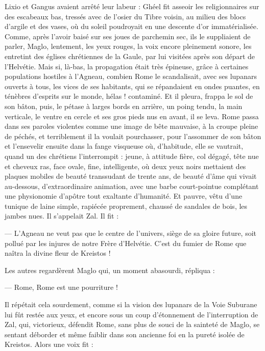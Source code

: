 \documentclass[a4paper, 11pt, oneside, polutonikogreek, french]{article}
\begin{document}
Lixio et Gangus avaient arrêté leur labeur : Ghéel fit asseoir les religionnaires sur des escabeaux bas, tressés avec de l'osier du Tibre voisin, au milieu des blocs d'argile et des vases, où du soleil poudroyait en une descente d'or immatérialisée. Comme, après l'avoir baisé sur ses joues de parchemin sec, ils le suppliaient de parler, Maglo, lentement, les yeux rouges, la voix encore pleinement sonore, les entretint des églises chrétiennes de la Gaule, par lui visitées après son départ de l'Helvétie. Mais si, là-bas, la propagation était très épineuse, grâce à certaines populations hostiles à l'Agneau, combien Rome le scandalisait, avec ses lupanars ouverts à tous, les vices de ses habitants, qui se répandaient en ondes puantes, en ténèbres d'esprits sur le monde, hélas ! contaminé. Et il pleura, frappa le sol de son bâton, puis, le pétase à larges bords en arrière, un poing tendu, la main verticale, le ventre en cercle et ses gros pieds nus en avant, il se leva. Rome passa dans ses paroles violentes comme une image de bête mauvaise, à la croupe pleine de péchés, et terriblement il la voulait pourchasser, pour l'assommer de son bâton et l'ensevelir ensuite dans la fange visqueuse où, d'habitude, elle se vautrait, quand un des chrétiens l'interrompit : jeune, à attitude fière, col dégagé, tête nue et cheveux ras, face ovale, fine, intelligente, où deux yeux noirs mettaient des plaques mobiles de beauté transsudant de trente ans, de beauté d'âme qui vivait au-dessous, d'extraordinaire animation, avec une barbe court-pointue complétant une physionomie d'apôtre tout exaltante d'humanité. Et pauvre, vêtu d'une tunique de laine simple, rapiécée proprement, chaussé de sandales de bois, les jambes nues. Il s'appelait Zal. Il fit :

--- L'Agneau ne veut pas que le centre de l'univers, siège de sa gloire future, soit pollué par les injures de notre Frère d'Helvétie. C'est du fumier de Rome que naîtra la divine fleur de Kreistos !

Les autres regardèrent Maglo qui, un moment abasourdi, répliqua :

--- Rome, Rome est une pourriture !

Il répétait cela sourdement, comme si la vision des lupanars de la Voie Suburane lui fût restée aux yeux, et encore sous un coup d'étonnement de l'interruption de Zal, qui, victorieux, défendit Rome, sans plus de souci de la sainteté de Maglo, se sentant déborder et même faiblir dans son ancienne foi en la pureté isolée de Kreistos. Alors une voix fit :
\end{document}

